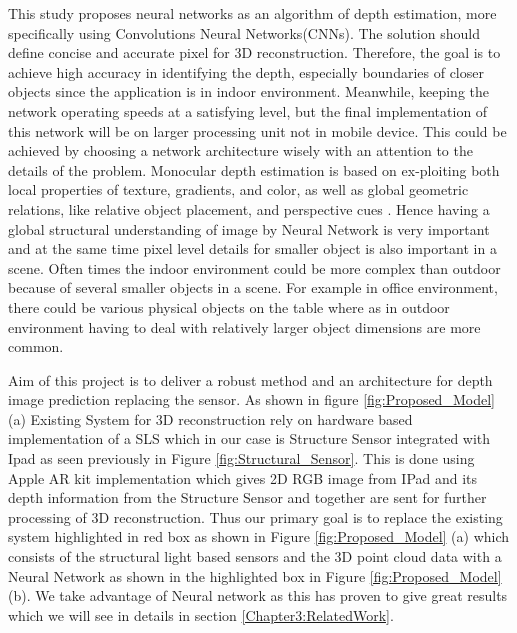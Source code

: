 This study proposes neural networks as an algorithm of depth estimation, more specifically using Convolutions Neural Networks(CNNs). The solution should define concise and accurate pixel for 3D reconstruction. Therefore, the goal is to achieve high accuracy in identifying the depth, especially boundaries of closer objects since the application is in indoor environment. Meanwhile, keeping the network operating speeds at a satisfying level, but the final implementation of this network will be on larger processing unit not in mobile device. This could be achieved by choosing a network architecture wisely with an attention to the details of the problem. Monocular depth estimation is based on ex-ploiting both local properties of texture, gradients, and color, as well as global geometric relations, like relative object placement, and perspective cues \cite{saxena2006learning}. Hence having a global structural understanding of image by Neural Network is very important and at the same time pixel level details for smaller object is also important in a scene. Often times the indoor environment could be more complex than outdoor because of several smaller objects in a scene. For example in office environment, there could be various physical objects on the table where as in outdoor environment having to deal with relatively larger object dimensions are more common.  

Aim of this project is to deliver a robust method and an architecture for depth image prediction replacing the sensor. As shown in figure \ref{fig:Proposed_Model} (a) Existing System for 3D reconstruction rely on hardware based implementation of a SLS which in our case is Structure Sensor integrated with Ipad as seen previously in Figure \ref{fig:Structural_Sensor}. This is done using Apple AR kit implementation which gives 2D RGB image from IPad and its depth information from the Structure Sensor and together are sent for further processing of 3D reconstruction. Thus our primary goal is to replace the existing system highlighted in red box as shown in Figure \ref{fig:Proposed_Model} (a) which consists of the structural light based sensors and the 3D point cloud data with a Neural Network as shown in the highlighted box in Figure \ref{fig:Proposed_Model}(b). We take advantage of Neural network as this has proven to give great results which we will see in details in section \ref{Chapter3:RelatedWork}.


